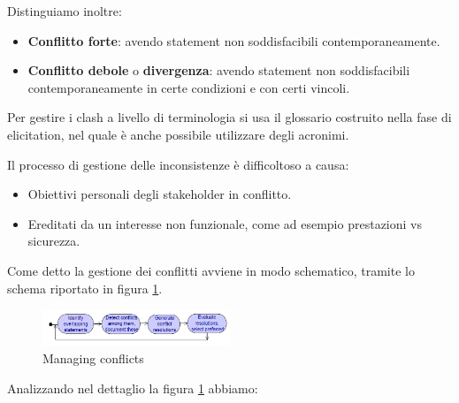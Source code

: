 Distinguiamo inoltre:
\begin{itemize}
      \item \textbf{Conflitto forte}: avendo statement non soddisfacibili
            contemporaneamente.
      \item \textbf{Conflitto debole} o \textbf{divergenza}: avendo statement
            non soddisfacibili contemporaneamente in certe condizioni e con certi
            vincoli.
\end{itemize}
Per gestire i clash a livello di terminologia si usa il glossario costruito nella
fase di elicitation, nel quale è anche possibile utilizzare degli acronimi.

Il processo di gestione delle inconsistenze è difficoltoso a causa:
\begin{itemize}
      \item Obiettivi personali degli stakeholder in conflitto.
      \item Ereditati da un interesse non funzionale, come ad esempio prestazioni
            vs sicurezza.
\end{itemize}
Come detto la gestione dei conflitti avviene in modo schematico, tramite lo
schema riportato in figura \ref{fig:conflicts}.
\begin{figure}[!ht]
      \centering
      \includegraphics[width=0.5\textwidth]{img/requirements/conflicts.png}
      \caption{Managing conflicts}
      \label{fig:conflicts}
\end{figure}
Analizzando nel dettaglio la figura \ref{fig:conflicts} abbiamo:
